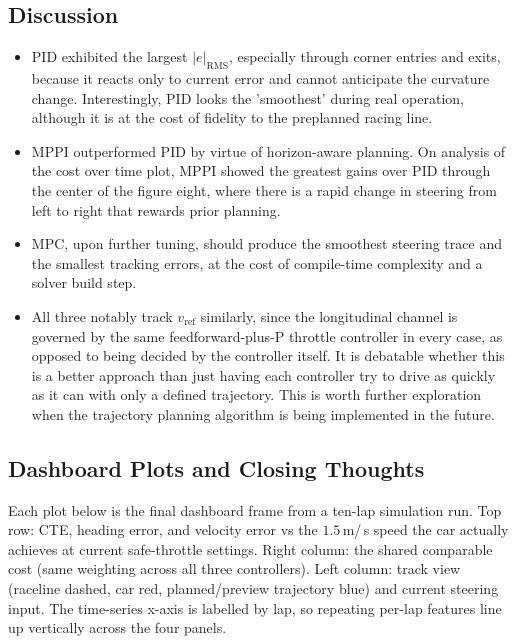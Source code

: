 \documentclass[11pt]{article}
\begin{document}
\subsection{Discussion}

\begin{itemize}
  \item PID exhibited the largest $|e|_{\text{RMS}}$, especially
        through corner entries and exits, because it reacts only to current
        error and cannot anticipate the curvature change. Interestingly, PID looks the 'smoothest' during real operation, although it is at the cost of fidelity to the preplanned racing line.
  \item MPPI outperformed PID by virtue of horizon-aware planning. On analysis of the cost over time plot, MPPI showed the greatest gains over PID through the center of the figure eight, where there is a rapid change in steering from left to right that rewards prior planning.
  \item MPC, upon further tuning, should produce the smoothest steering trace and the
        smallest tracking errors, at the cost of compile-time complexity and
        a solver build step.
  \item All three notably track $v_{\text{ref}}$ similarly, since the
        longitudinal channel is governed by the same feedforward-plus-P
        throttle controller in every case, as opposed to being decided by the controller itself. It is debatable whether this is a better approach than just having each controller try to drive as quickly as it can with only a defined trajectory. This is worth further exploration when the trajectory planning algorithm is being implemented in the future.
\end{itemize}

\subsection{Dashboard Plots and Closing Thoughts}

Each plot below is the final dashboard frame from a ten-lap simulation run.
Top row: CTE, heading error, and velocity error vs the $1.5$\,m/\,s
speed the car actually achieves at current safe-throttle settings.  Right column:
the shared comparable cost (same weighting across all three controllers).
Left column: track view (raceline dashed, car red, planned/preview
trajectory blue) and current steering input.  The time-series x-axis is
labelled by lap, so repeating per-lap features line up vertically across
the four panels.
\end{document}
